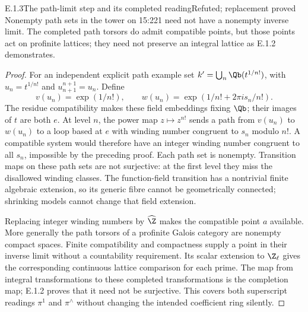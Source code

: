 \begin{result}{E.1.3}{The path-limit step and its completed reading}{Refuted; replacement proved}
Nonempty path sets in the tower on 15:221 need not have a nonempty inverse limit. The completed path torsors do admit compatible points, but those points act on profinite lattices; they need not preserve an integral lattice as E.1.2 demonstrates.
\end{result}
\begin{proof}
For an independent explicit path example set $k'=\bigcup_n\Qb(t^{1/n!})$, with $u_n=t^{1/n!}$ and $u_{n+1}^{n+1}=u_n$. Define
\[
 v(u_n)=\exp(1/n!),\qquad
 w(u_n)=\exp(1/n!+2\pi i s_n/n!).
\]
The residue compatibility makes these field embeddings fixing $\Qb$; their images of $t$ are both $e$. At level $n$, the power map $z\mapsto z^{n!}$ sends a path from $v(u_n)$ to $w(u_n)$ to a loop based at $e$ with winding number congruent to $s_n$ modulo $n!$. A compatible system would therefore have an integer winding number congruent to all $s_n$, impossible by the preceding proof. Each path set is nonempty. Transition maps on these path sets are not surjective: at the first level they miss the disallowed winding classes. The function-field transition has a nontrivial finite algebraic extension, so its generic fibre cannot be geometrically connected; shrinking models cannot change that field extension.

Replacing integer winding numbers by $\widehat\Z$ makes the compatible point $a$ available. More generally the path torsors of a profinite Galois category are nonempty compact spaces. Finite compatibility and compactness supply a point in their inverse limit without a countability requirement. Its scalar extension to $\Z_\ell$ gives the corresponding continuous lattice comparison for each prime. The map from integral transformations to these completed transformations is the completion map; E.1.2 proves that it need not be surjective. This covers both superscript readings $\pi^1$ and $\pi^{\wedge}$ without changing the intended coefficient ring silently.
\end{proof}


